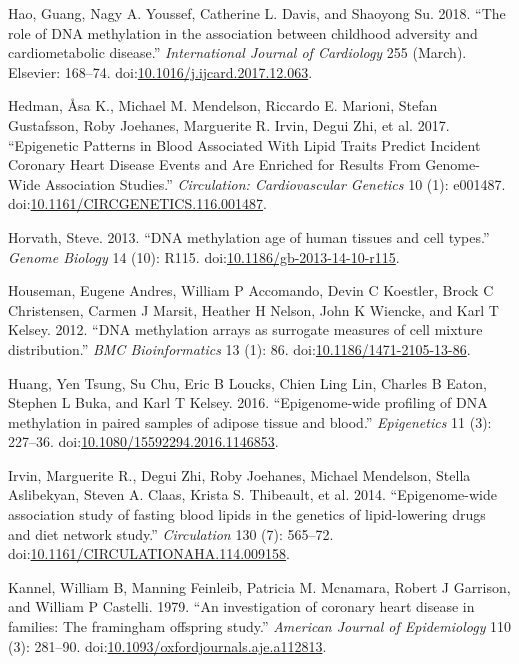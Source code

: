 \documentclass[]{article}
\theoremstyle{definition}
\theoremstyle{definition}
\theoremstyle{definition}
\theoremstyle{remark}
\begin{document}
Hao, Guang, Nagy A. Youssef, Catherine L. Davis, and Shaoyong Su. 2018.
``The role of DNA methylation in the association between childhood
adversity and cardiometabolic disease.'' \emph{International Journal of
Cardiology} 255 (March). Elsevier: 168--74.
doi:\href{http://dx.doi.org/10.1016/j.ijcard.2017.12.063}{10.1016/j.ijcard.2017.12.063}.

Hedman, {Å}sa K., Michael M. Mendelson, Riccardo E. Marioni, Stefan
Gustafsson, Roby Joehanes, Marguerite R. Irvin, Degui Zhi, et al. 2017.
``Epigenetic Patterns in Blood Associated With Lipid Traits Predict
Incident Coronary Heart Disease Events and Are Enriched for Results From
Genome-Wide Association Studies.'' \emph{Circulation: Cardiovascular
Genetics} 10 (1): e001487.
doi:\href{http://dx.doi.org/10.1161/CIRCGENETICS.116.001487}{10.1161/CIRCGENETICS.116.001487}.

Horvath, Steve. 2013. ``DNA methylation age of human tissues and cell
types.'' \emph{Genome Biology} 14 (10): R115.
doi:\href{http://dx.doi.org/10.1186/gb-2013-14-10-r115}{10.1186/gb-2013-14-10-r115}.

Houseman, Eugene Andres, William P Accomando, Devin C Koestler, Brock C
Christensen, Carmen J Marsit, Heather H Nelson, John K Wiencke, and Karl
T Kelsey. 2012. ``DNA methylation arrays as surrogate measures of cell
mixture distribution.'' \emph{BMC Bioinformatics} 13 (1): 86.
doi:\href{http://dx.doi.org/10.1186/1471-2105-13-86}{10.1186/1471-2105-13-86}.

Huang, Yen Tsung, Su Chu, Eric B Loucks, Chien Ling Lin, Charles B
Eaton, Stephen L Buka, and Karl T Kelsey. 2016. ``Epigenome-wide
profiling of DNA methylation in paired samples of adipose tissue and
blood.'' \emph{Epigenetics} 11 (3): 227--36.
doi:\href{http://dx.doi.org/10.1080/15592294.2016.1146853}{10.1080/15592294.2016.1146853}.

Irvin, Marguerite R., Degui Zhi, Roby Joehanes, Michael Mendelson,
Stella Aslibekyan, Steven A. Claas, Krista S. Thibeault, et al. 2014.
``Epigenome-wide association study of fasting blood lipids in the
genetics of lipid-lowering drugs and diet network study.''
\emph{Circulation} 130 (7): 565--72.
doi:\href{http://dx.doi.org/10.1161/CIRCULATIONAHA.114.009158}{10.1161/CIRCULATIONAHA.114.009158}.

Kannel, William B, Manning Feinleib, Patricia M. Mcnamara, Robert J
Garrison, and William P Castelli. 1979. ``An investigation of coronary
heart disease in families: The framingham offspring study.''
\emph{American Journal of Epidemiology} 110 (3): 281--90.
doi:\href{http://dx.doi.org/10.1093/oxfordjournals.aje.a112813}{10.1093/oxfordjournals.aje.a112813}.
\end{document}
